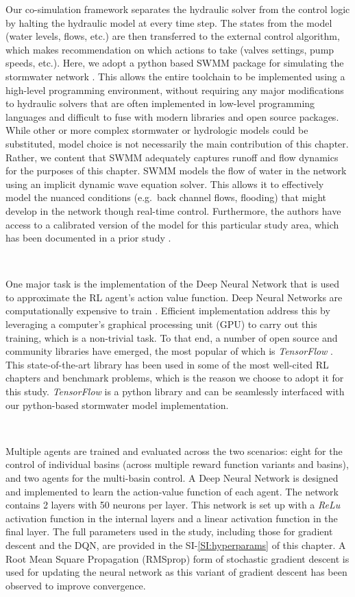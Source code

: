 Our co-simulation framework separates the hydraulic solver from the control logic by halting the hydraulic model at every time step.
The states from the model (water levels, flows, etc.) are then transferred to the external control algorithm, which makes recommendation on which actions to take (valves settings, pump speeds, etc.).
Here, we adopt a python based SWMM package for simulating the stormwater network \cite{Riano-Briceno2016MatSWMMSystems}.
This allows the entire toolchain to be implemented using a high-level programming environment, without requiring any major modifications to hydraulic solvers that are often implemented in low-level programming languages and difficult to fuse with modern libraries and open source packages.
While other or more complex stormwater or hydrologic models could be substituted, model choice is not necessarily the main contribution of this chapter.
Rather, we content that SWMM adequately captures runoff and flow dynamics for the purposes of this chapter.
SWMM models the flow of water in the network using an implicit dynamic wave equation solver\cite{Rossman2010Storm5.1}.
This allows it to effectively model the nuanced conditions (e.g.\ back channel flows, flooding) that might develop in the network though real-time control.
Furthermore, the authors have access to a calibrated version of the model for this particular study area, which has been documented in a prior study \cite{aaswmm,wong2018real}.

\

One major task is the implementation of the Deep Neural Network that is used to approximate the RL agent’s action value function.
Deep Neural Networks are computationally expensive to train \cite{LeCun2015DeepLearning}.
Efficient implementation address this by leveraging a computer's graphical processing unit (GPU) to carry out this training, which is a non-trivial task.
To that end, a number of open source and community libraries have emerged, the most popular of which is \textit{TensorFlow} \cite{AbadiThisLearning}.
This state-of-the-art library has been used in some of the most well-cited RL chapters and benchmark problems, which is the reason we choose to adopt it for this study.
\textit{TensorFlow} is a python library and can be seamlessly interfaced with our python-based stormwater model implementation.

\

Multiple agents are trained and evaluated across the two scenarios: eight for the control of individual basins (across multiple reward function variants and basins), and two agents for the multi-basin control.
A Deep Neural Network is designed and implemented to learn the action-value function of each agent.
The network contains 2 layers with 50 neurons per layer.
This network is set up with a \textit{ReLu} activation function \cite{goodfellow2016Deep} in the internal layers and a linear activation function in the final layer.
The full parameters used in the study, including those for gradient descent and the DQN, are provided in the SI-\ref{SI:hyperparams} of this chapter.
A Root Mean Square Propagation (RMSprop) \cite{goodfellow2016Deep} form of stochastic gradient descent is used for updating the neural network as this variant of gradient descent has been observed to improve convergence.

